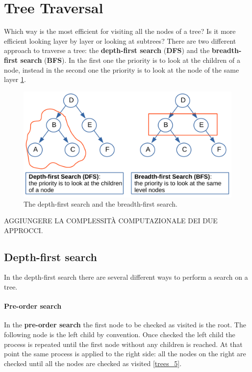\section{Tree Traversal}
Which way is the most efficient for visiting all the nodes of a tree? Is it more efficient looking layer by layer or looking at subtrees? There are two different approach to traverse a tree: the \textbf{depth-first search} (\textbf{DFS}) and the \textbf{breadth-first search} (\textbf{BFS}). In the first one the priority is to look at the children of a node, instead in the second one the priority is to look at the node of the same layer \ref{trees_4}.

\begin{figure}[H]
	\begin{center}
		\includegraphics[scale=.6]{chapters/trees/images/trees_4.pdf}
		\caption[The depth-first search and the breadth-first search.]{The depth-first search and the breadth-first search.}
		\label{trees_4}
	\end{center}
\end{figure}

AGGIUNGERE LA COMPLESSITÀ COMPUTAZIONALE DEI DUE APPROCCI.

\subsection{Depth-first search}
In the depth-first search there are several different ways to perform a search on a tree.
\paragraph{Pre-order search}
\label{preorder}
In the \textbf{pre-order search} the first node to be checked as visited is the root. The following node is the left child by convention. Once checked the left child the process is repeated until the first node without any children is reached. At that point the same process is applied to the right side: all the nodes on the right are checked until all the nodes are checked as visited \ref{trees_5}.


